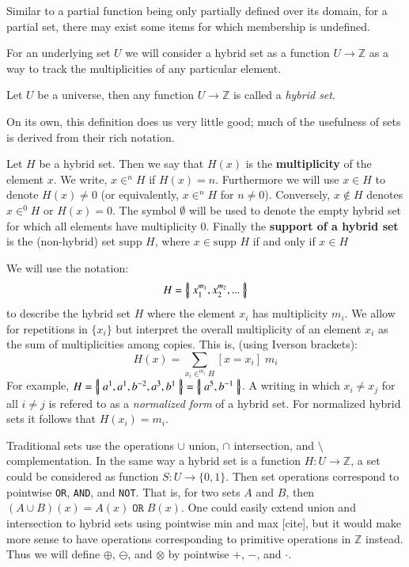 Similar to a partial function being only partially defined over its domain, 
for a partial set, there may exist some items for which membership is undefined.


For an underlying set $U$ we will consider a hybrid set as a function $U \to \mathbb{Z}$ as a way to track the multiplicities of any particular element.

\begin{definition}
	Let $U$ be a universe, then any function $U \to \mathbb{Z}$ is called a \emph{hybrid set}.
\end{definition}

On its own, this definition does us very little good; much of the usefulness of sets is derived from their rich notation.

\begin{definition}
	Let $H$ be a hybrid set. 
	Then we say that $H(x)$ is the \textbf{multiplicity} of the element $x$. 
	We write, $x \in^n H$ if $H(x)=n$. 
	Furthermore we will use $x \in H$ to denote $H(x)\neq 0$ (or equivalently, $x \in^n H$ for $n\neq 0$).
	Conversely, $x \notin H$ denotes $x \in^0 H$ or $H(x)=0$.
	The symbol $\emptyset$ will be used to denote the empty hybrid set for which all elements have multiplicity 0.
	Finally the \textbf{support of a hybrid set} is the (non-hybrid) set $\text{supp }H$,
	where $x \in \text{supp }H$ if and only if $x \in H$
\end{definition}


We will use the notation:
\begin{equation*}
	H = \left\{ \! \left| \; x_1^{m_1}, x_2^{m_2},... \; \right| \! \right\}
\end{equation*}
to describe the hybrid set $H$ where the element $x_i$ has multiplicity $m_i$. 
We allow for repetitions in $\{ x_i \}$ but interpret the overall multiplicity of an element $x_i$ as 
the sum of multiplicities among copies. This is, (using Iverson brackets):
\begin{equation}
	H(x) = \sum_{x_i \in^{m_i} H} [x = x_i] \; m_i
\end{equation}
For example, $H=\left\{ \! \left| \; a^1, a^1, b^{-2}, a^3, b^1 \; \right| \! \right\} = \left\{ \! \left| \; a^5, b^{-1} \; \right| \! \right\}$. 
A writing in which $x_i \neq x_j$ for all $i \neq j$ is refered to as a \emph{normalized form} of a hybrid set. 
For normalized hybrid sets it follows that $H(x_i) = m_i$.



Traditional sets use the operations $\cup$ union, $\cap$ intersection, and $\setminus$ complementation.
In the same way a hybrid set is a function $H : U \to \mathbb{Z}$, 
a set could be considered as function $S : U \to \{ 0,1 \}$.
Then set operations correspond to pointwise \texttt{OR}, \texttt{AND}, and \texttt{NOT}.
That is, for two sets $A$ and $B$, then $(A \cup B)(x) = A(x) \;\mathtt{OR}\; B(x)$.
One could easily extend union and intersection to hybrid sets using pointwise min and max
[cite],
but it would make more sense to have operations corresponding to primitive operations in $\mathbb{Z}$ instead.
Thus we will define $\oplus$, $\ominus$, and $\otimes$ by pointwise $+$, $-$, and $\cdot$.

